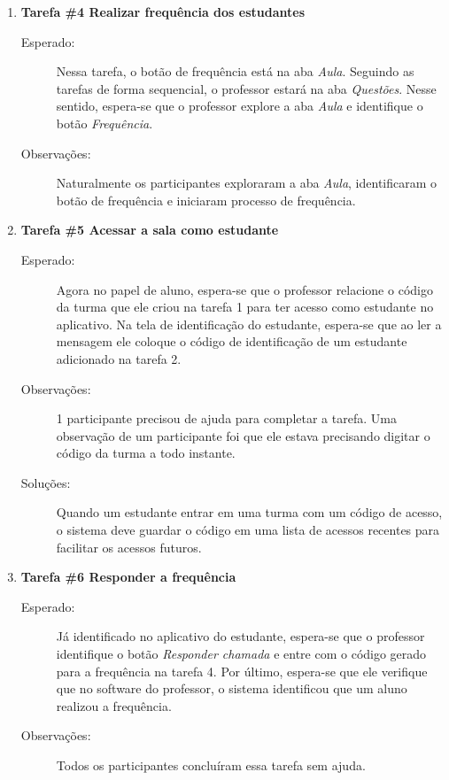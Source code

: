 \begin{enumerate}[label={},leftmargin=*]
  \item \textbf{Tarefa \#4 Realizar frequência dos estudantes}
  \begin{description}
    \item[Esperado:] Nessa tarefa, o botão de frequência está na aba \textit{Aula}. Seguindo as tarefas de forma
    sequencial, o professor estará na aba \textit{Questões}. Nesse sentido, espera-se
    que o professor explore a aba \textit{Aula} e identifique o botão \textit{Frequência}.
    \item[Observações:] Naturalmente os participantes exploraram a aba \textit{Aula}, identificaram o botão de
    frequência e iniciaram processo de frequência.
  \end{description}

  \item \textbf{Tarefa \#5 Acessar a sala como estudante}
  \begin{description}
    \item [Esperado:] Agora no papel de aluno, espera-se que o professor relacione o código da turma que
    ele criou na tarefa 1 para ter acesso como estudante no aplicativo. Na tela de identificação do estudante,
    espera-se que ao ler a mensagem ele coloque o código de identificação de um estudante adicionado na tarefa 2.
    \item [Observações:] 1 participante precisou de ajuda para completar a tarefa. Uma observação de um
    participante foi que ele estava precisando digitar o código da turma a todo instante.
    \item [Soluções:] Quando um estudante entrar em uma turma com um código de acesso, o sistema
    deve guardar o código em uma lista de acessos recentes para facilitar os acessos futuros.
  \end{description}

  \item \textbf{Tarefa \#6 Responder a frequência}
  \begin{description}
    \item [Esperado:] Já identificado no aplicativo do estudante, espera-se que o professor identifique
    o botão \textit{Responder chamada} e entre com o código gerado para a frequência na tarefa 4.
    Por último, espera-se que ele verifique que no software do professor, o sistema identificou
    que um aluno realizou a frequência.
    \item [Observações:] Todos os participantes concluíram essa tarefa sem ajuda.
  \end{description}


\end{enumerate}
